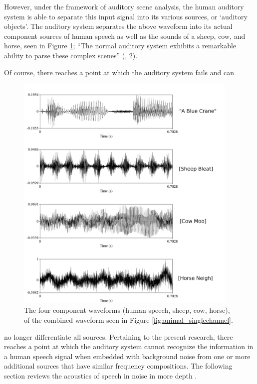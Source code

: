 However, under the framework of auditory scene analysis, the human auditory system is able to separate this input signal into its various sources, or `auditory objects'.  The auditory system separates the above waveform into its actual component sources of human speech as well as the sounds of a sheep, cow, and horse, seen in Figure \ref{fig:animal_multichannel}; ``The normal auditory system exhibits a remarkable ability to parse these complex scenes'' (\cite{middlebrooks:17}, 2).

Of course, there reaches a point at which the auditory system fails and can
%
\begin{figure}[h!]
\centering
  \includegraphics[width=0.95\textwidth]{figure/animal_multichannel-w-text.png}
  \caption{The four component waveforms (human speech, sheep, cow, horse), of the combined waveform seen in Figure \ref{fig:animal_singlechannel}.}
  \label{fig:animal_multichannel}
\end{figure}
%
no longer differentiate all sources. Pertaining to the present research, there reaches a point at which the auditory system cannot recognize the information in a human speech signal when embedded with background noise from one or more additional sources that have similar frequency compositions.  The following section reviews the acoustics of speech in noise in more depth .
  
